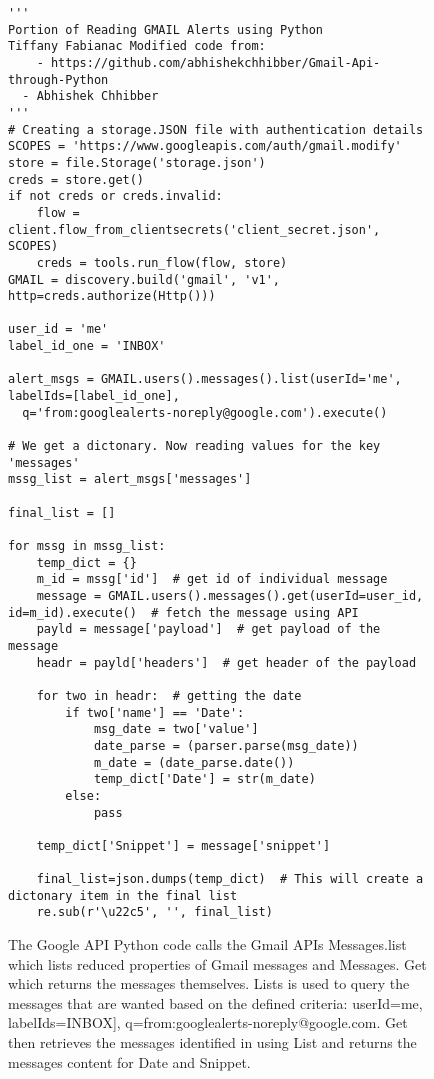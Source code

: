 \documentclass[sigconf]{acmart}
\begin{document}
\begin{figure*}[htb]
\begin{verbatim}
'''
Portion of Reading GMAIL Alerts using Python
Tiffany Fabianac Modified code from:
    - https://github.com/abhishekchhibber/Gmail-Api-through-Python
  - Abhishek Chhibber
'''
# Creating a storage.JSON file with authentication details
SCOPES = 'https://www.googleapis.com/auth/gmail.modify' 
store = file.Storage('storage.json')
creds = store.get()
if not creds or creds.invalid:
    flow = client.flow_from_clientsecrets('client_secret.json', SCOPES)
    creds = tools.run_flow(flow, store)
GMAIL = discovery.build('gmail', 'v1', http=creds.authorize(Http()))

user_id = 'me'
label_id_one = 'INBOX'

alert_msgs = GMAIL.users().messages().list(userId='me', labelIds=[label_id_one], 
  q='from:googlealerts-noreply@google.com').execute()

# We get a dictonary. Now reading values for the key 'messages'
mssg_list = alert_msgs['messages']

final_list = []

for mssg in mssg_list:
    temp_dict = {}
    m_id = mssg['id']  # get id of individual message
    message = GMAIL.users().messages().get(userId=user_id, id=m_id).execute()  # fetch the message using API
    payld = message['payload']  # get payload of the message
    headr = payld['headers']  # get header of the payload

    for two in headr:  # getting the date
        if two['name'] == 'Date':
            msg_date = two['value']
            date_parse = (parser.parse(msg_date))
            m_date = (date_parse.date())
            temp_dict['Date'] = str(m_date)
        else:
            pass

    temp_dict['Snippet'] = message['snippet']

    final_list=json.dumps(temp_dict)  # This will create a dictonary item in the final list
    re.sub(r'\u22c5', '', final_list)
\end{verbatim}
\caption{The Google API Python code calls the Gmail APIs Messages.list which lists reduced properties of Gmail messages and Messages. Get which returns the messages themselves. Lists is used to query the messages that are wanted based on the defined criteria: userId=me, labelIds=INBOX], q=from:googlealerts-noreply@google.com. Get then retrieves the messages identified in using List and returns the messages content for Date and Snippet.}\label{c:googleapi}
\end{figure*}
\end{document}
